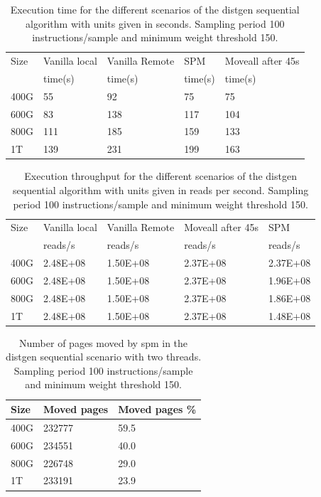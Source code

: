 \begin{table}[th]
	\centering
		\begin{tabularx}{.9\textwidth}{|l|l|l|l|X|}
		\hline
			Size & Vanilla local & Vanilla Remote & SPM & Moveall after 45s  \\
			 & time(s) & time(s) & time(s) & time(s)  \\
			\hline
			400G & 55 & 92  & 75 & 75\\
			\hline
			600G & 83 & 138 & 117 & 104 \\
			\hline
			800G & 111 & 185 & 159 & 133 \\
			\hline
			1T & 139 & 231 & 199 & 163 \\
			\hline
		\end{tabularx}
		\caption{Execution time for the different scenarios of the distgen sequential algorithm with units given in seconds. Sampling period 100 instructions/sample and minimum weight threshold 150.}
		\label{table:res-tbl-dgentimseq2t}
\end{table}

\begin{table}[th]
	\centering
		\begin{tabularx}{\textwidth}{|l|l|l|l|X|}
		\hline
			Size & Vanilla local & Vanilla Remote & Moveall after 45s & SPM \\
			 & reads/s & reads/s & reads/s & reads/s  \\
			\hline
			400G & 2.48E+08 & 1.50E+08 & 2.37E+08& 2.37E+08\\
			\hline
			600G & 2.48E+08 & 1.50E+08  & 2.37E+08 & 1.96E+08\\
			\hline
			800G & 2.48E+08 & 1.50E+08 & 2.37E+08 & 1.86E+08 \\
			\hline
			1T & 2.48E+08 & 1.50E+08 & 2.37E+08 & 1.48E+08 \\
			\hline
		\end{tabularx}
		\caption{Execution throughput for the different scenarios of the distgen sequential algorithm with units given in reads per second. Sampling period 100 instructions/sample and minimum weight threshold 150.}
		\label{table:res-dgentrgseq2t}
\end{table}

\begin{table}[th]
	\centering
		\begin{tabularx}{.6\textwidth}{|l|l|X|}
		\hline
			Size & Moved pages & Moved pages \%  \\
			\hline
			400G & 232777 & 59.5 \\
			\hline
			600G & 234551 & 40.0\\
			\hline
			800G & 226748 & 29.0 \\
			\hline
			1T & 233191 & 23.9 \\
			\hline
		\end{tabularx}
		\caption{Number of pages moved by spm in the distgen sequential scenario with two threads. Sampling period 100 instructions/sample and minimum weight threshold 150.}
		\label{table:res-dgenmvdseq2t}
\end{table}

